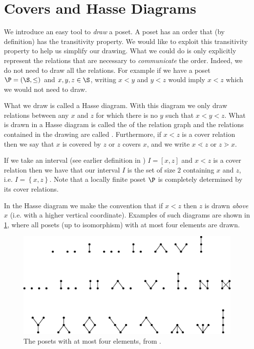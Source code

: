 \section{Covers and Hasse Diagrams}
\label{tree:poset:hasse}

We introduce an easy tool to \emph{draw} a poset. A poset has an order that (by definition) has the transitivity property.
We would like to exploit this transitivity property to help us simplify our
drawing. What we could do is only explicitly represent the relations that are
necessary to \emph{communicate} the order. Indeed, we do not need to draw
all the relations. For example if we have a poset $\P = (\S, \le)$ and $x, y, z
\in \S$, writing $x < y$ and $y < z$ would imply $x < z$ which we would not need
to draw.


What we draw is called a Hasse diagram. With this diagram we only draw
relations between any $x$ and $z$ for which there is no $y$ such that $x < y <
z$.
What is drawn in a Hasse diagram is called the 
of the relation graph and the relations contained in the drawing are called
. Furthermore, if $x < z$ is a cover relation then we
say that $x$ is covered by $z$ or $z$ covers $x$, and we write $x \lessdot z$
or $z \gtrdot x$.


If we take an interval (see earlier definition in ) $I
= [x, z]$ and $x < z$ is a cover relation then we have that our interval $I$ is
the set of size $2$ containing $x$ and $z$, i.e. $I = \left\{{x, z}\right\}$.
Note that a locally finite poset $\P$ is completely determined by its cover
relations.

In the Hasse diagram we make the convention that if $x < z$ then $z$ is drawn
\emph{above} $x$ (i.e. with a higher vertical coordinate). Examples of such
diagrams are shown in \ref{fig:stanley:3-1}, where all posets (up to
isomorphism) with at most four elements are drawn.


\begin{figure}
	\centering
	\includegraphics[width=\textwidth]{fig/stanley/3-1}
	\caption{\label{fig:stanley:3-1} The posets with at most four elements,
from \citet*{Stanley:2011:ECV:2124415}.}
\end{figure}


